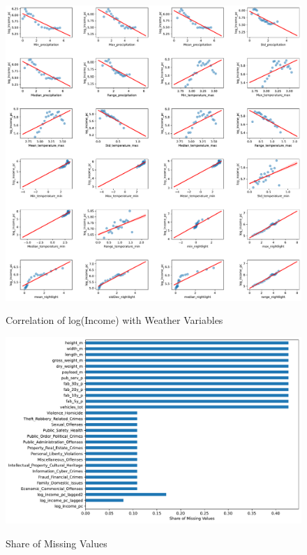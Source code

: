 \begin{figure}[H]
    \centering
    \caption{Correlation of log(Income) with Weather Variables}
    \includegraphics[width=1\textwidth]{../figures/figD_correlation_ml_dataset_weather_variables.pdf}
    \label{fig:enter-label}
\end{figure}


\begin{figure}[H]
    \centering
    \caption{Share of Missing Values}
    \includegraphics[width=1\textwidth]{../figures/figE_share_of_missings.pdf}
    \label{fig:enter-label}
\end{figure}


